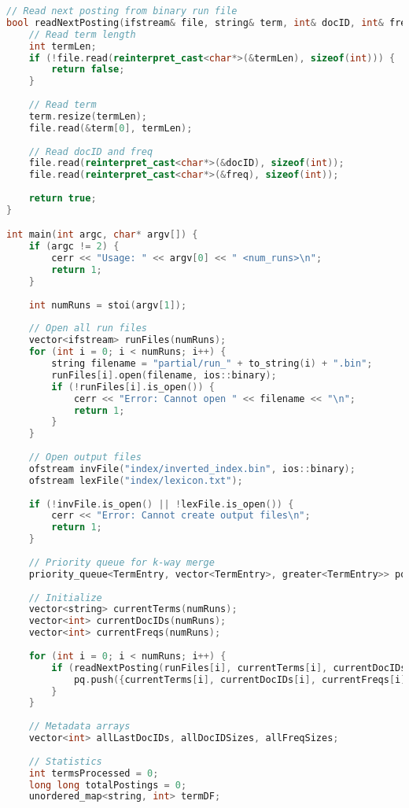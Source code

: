 \documentclass[11pt, a4paper]{report}
\begin{document}
\begin{lstlisting}[language=C++, caption={The complete source code for the merger component.}, label={lst:merger}]
// Read next posting from binary run file
bool readNextPosting(ifstream& file, string& term, int& docID, int& freq) {
    // Read term length
    int termLen;
    if (!file.read(reinterpret_cast<char*>(&termLen), sizeof(int))) {
        return false;
    }
    
    // Read term
    term.resize(termLen);
    file.read(&term[0], termLen);
    
    // Read docID and freq
    file.read(reinterpret_cast<char*>(&docID), sizeof(int));
    file.read(reinterpret_cast<char*>(&freq), sizeof(int));
    
    return true;
}

int main(int argc, char* argv[]) {
    if (argc != 2) {
        cerr << "Usage: " << argv[0] << " <num_runs>\n";
        return 1;
    }
    
    int numRuns = stoi(argv[1]);
    
    // Open all run files
    vector<ifstream> runFiles(numRuns);
    for (int i = 0; i < numRuns; i++) {
        string filename = "partial/run_" + to_string(i) + ".bin";
        runFiles[i].open(filename, ios::binary);
        if (!runFiles[i].is_open()) {
            cerr << "Error: Cannot open " << filename << "\n";
            return 1;
        }
    }
    
    // Open output files
    ofstream invFile("index/inverted_index.bin", ios::binary);
    ofstream lexFile("index/lexicon.txt");
    
    if (!invFile.is_open() || !lexFile.is_open()) {
        cerr << "Error: Cannot create output files\n";
        return 1;
    }
    
    // Priority queue for k-way merge
    priority_queue<TermEntry, vector<TermEntry>, greater<TermEntry>> pq;
    
    // Initialize
    vector<string> currentTerms(numRuns);
    vector<int> currentDocIDs(numRuns);
    vector<int> currentFreqs(numRuns);
    
    for (int i = 0; i < numRuns; i++) {
        if (readNextPosting(runFiles[i], currentTerms[i], currentDocIDs[i], currentFreqs[i])) {
            pq.push({currentTerms[i], currentDocIDs[i], currentFreqs[i], i});
        }
    }
    
    // Metadata arrays
    vector<int> allLastDocIDs, allDocIDSizes, allFreqSizes;
    
    // Statistics
    int termsProcessed = 0;
    long long totalPostings = 0;
    unordered_map<string, int> termDF;
    

\end{lstlisting}
\end{document}
